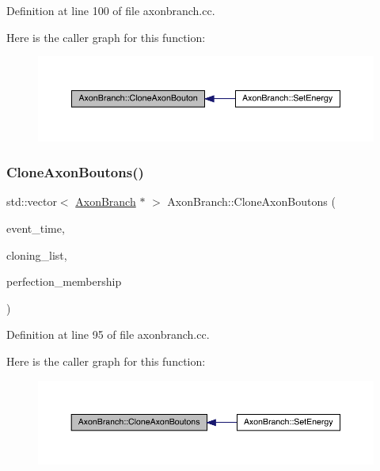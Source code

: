 Definition at line 100 of file axonbranch.\+cc.

Here is the caller graph for this function\+:\nopagebreak
\begin{figure}[H]
\begin{center}
\leavevmode
\includegraphics[width=350pt]{class_axon_branch_ae861207a8a0aeb2b60c305b25248e4b9_icgraph}
\end{center}
\end{figure}
\mbox{\label{class_axon_branch_a842b3875b2771f4b8e7316bfb9af894c}} 
\subsubsection{\texorpdfstring{Clone\+Axon\+Boutons()}{CloneAxonBoutons()}}
{\footnotesize\ttfamily std\+::vector$<$ \hyperlink{class_axon_branch}{Axon\+Branch} $\ast$ $>$ Axon\+Branch\+::\+Clone\+Axon\+Boutons (\begin{DoxyParamCaption}\item[{std\+::chrono\+::time\+\_\+point$<$ \hyperlink{universe_8h_a0ef8d951d1ca5ab3cfaf7ab4c7a6fd80}{Clock} $>$}]{event\+\_\+time,  }\item[{std\+::vector$<$ \hyperlink{class_axon_branch}{Axon\+Branch} $\ast$$>$}]{cloning\+\_\+list,  }\item[{double}]{perfection\+\_\+membership }\end{DoxyParamCaption})}



Definition at line 95 of file axonbranch.\+cc.

Here is the caller graph for this function\+:\nopagebreak
\begin{figure}[H]
\begin{center}
\leavevmode
\includegraphics[width=350pt]{class_axon_branch_a842b3875b2771f4b8e7316bfb9af894c_icgraph}
\end{center}
\end{figure}
\mbox{\label{class_axon_branch_a30b4602e5dd121666478ff9de52d022b}} 
